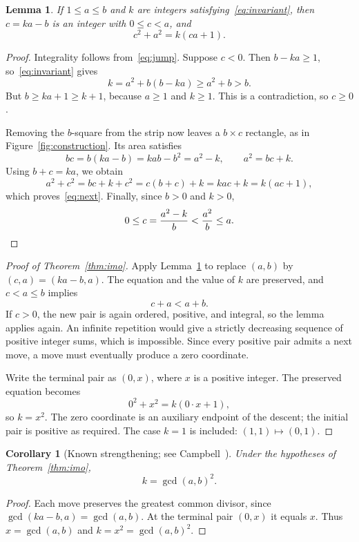 \documentclass[11pt,a4paper]{article}
\newtheorem{lemma}[theorem]{Lemma}
\newtheorem{corollary}[theorem]{Corollary}
\begin{document}
\begin{lemma}\label{lem:descent}
If $1\le a\le b$ and $k$ are integers satisfying~\eqref{eq:invariant},
then $c=ka-b$ is an integer with $0\le c<a$, and
\begin{equation}\label{eq:next}
 c^2+a^2=k(ca+1).
\end{equation}
\end{lemma}

\begin{proof}
Integrality follows from~\eqref{eq:jump}. Suppose $c<0$. Then $b-ka\ge1$,
so~\eqref{eq:invariant} gives
\[
 k=a^2+b(b-ka)\ge a^2+b>b.
\]
But $b\ge ka+1\ge k+1$, because $a\ge1$ and $k\ge1$. This is a
contradiction, so $c\ge0$.

Removing the $b$-square from the strip now leaves a $b\times c$ rectangle,
as in Figure~\ref{fig:construction}. Its area satisfies
\begin{equation}\label{eq:area}
 bc=b(ka-b)=kab-b^2=a^2-k,\qquad a^2=bc+k.
\end{equation}
Using $b+c=ka$, we obtain
\[
 a^2+c^2=bc+k+c^2=c(b+c)+k=kac+k=k(ac+1),
\]
which proves~\eqref{eq:next}. Finally, since $b>0$ and $k>0$,
\begin{equation}\label{eq:decrease}
 0\le c=\frac{a^2-k}{b}<\frac{a^2}{b}\le a.\qedhere
\end{equation}
\end{proof}



\begin{proof}[Proof of Theorem~\ref{thm:imo}]
Apply Lemma~\ref{lem:descent} to replace $(a,b)$ by $(c,a)=(ka-b,a)$.
The equation and the value of $k$ are preserved, and $c<a\le b$ implies
\[
 c+a<a+b.
\]
If $c>0$, the new pair is again ordered, positive, and integral, so the
lemma applies again. An infinite repetition would give a strictly
decreasing sequence of positive integer sums, which is impossible.
Since every positive pair admits a next move, a move must eventually
produce a zero coordinate.

Write the terminal pair as $(0,x)$, where $x$ is a positive integer.
The preserved equation becomes
\[
 0^2+x^2=k(0\cdot x+1),
\]
so $k=x^2$. The zero coordinate is an auxiliary endpoint of the descent;
the initial pair is positive as required. The case $k=1$ is included:
$(1,1)\mapsto(0,1)$.
\end{proof}

\begin{corollary}[Known strengthening; see Campbell~\cite{campbell}]
Under the hypotheses of Theorem~\ref{thm:imo},
\[
 k=\gcd(a,b)^2.
\]
\end{corollary}
\begin{proof}
Each move preserves the greatest common divisor, since
$\gcd(ka-b,a)=\gcd(a,b)$. At the terminal pair $(0,x)$ it equals $x$.
Thus $x=\gcd(a,b)$ and $k=x^2=\gcd(a,b)^2$.
\end{proof}
\end{document}
